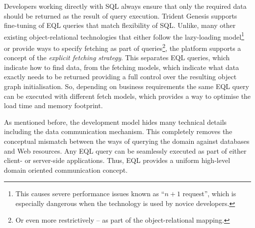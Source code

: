   Developers working directly with SQL always ensure that only the required data should be returned as the result of query execution.  
  Trident Genesis supports fine-tuning of EQL queries that match flexibility of SQL.
  Unlike, many other existing object-relational technologies that either follow the lazy-loading model\footnote{
  This causes severe performance issues known as ``$n+1$ request'', which is especially dangerous when the technology is used by novice developers.}
  or provide ways to specify fetching as part of queries\footnote{Or even more restrictively -- as part of the object-relational mapping.}, the platform supports a concept of the \emph{explicit fetching strategy}.
  This separates EQL queries, which indicate how to find data, from the fetching models, which indicate what data exactly needs to be returned providing a full control over the resulting object graph initialisation.
  So, depending on business requirements the same EQL query can be executed with different fetch models, which provides a way to optimise the load time and memory footprint.

  As mentioned before, the development model hides many technical details including the data communication mechanism.
  This completely removes the conceptual mismatch between the ways of querying the domain against databases and Web resources.
  Any EQL query can be seamlessly executed as part of either client- or server-side applications.
  Thus, EQL provides a uniform high-level domain oriented communication concept.